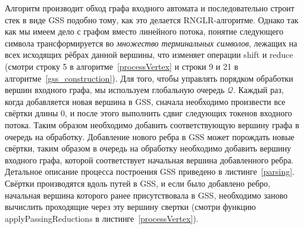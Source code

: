 Алгоритм производит обход графа входного автомата и последовательно строит стек в виде GSS подобно тому, как это делается RNGLR-алгоритме. Однако так как мы имеем дело с графом вместо линейного потока, понятие следующего символа трансформируется во \emph{множество терминальных символов}, лежащих на всех исходящих рёбрах данной вершины, что изменяет операции shift и reduce (смотри строку 5 в алгоритме~\ref{processVertex} и строки 9 и 21 в алгоритме~\ref{gss_construction}). Для того, чтобы управлять порядком обработки вершин входного графа, мы используем глобальную очередь $\mathcal{Q}$. Каждый раз, когда добавляется новая вершина в GSS, сначала необходимо произвести все свёртки длины 0, и после этого выполнить сдвиг следующих токенов входного потока. Таким образом необходимо добавить соответствующую вершину графа в очередь на обработку. Добавление нового ребра в GSS может порождать новые свёртки, таким образом в очередь на обработку необходимо добавить вершину входного графа, которой соответствует начальная вершина добавленного ребра. Детальное описание процесса построения GSS приведено в листинге~\ref{parsing}. Свёртки производятся вдоль путей в GSS, и если было добавлено ребро, начальная вершина которого ранее присутствовала в GSS, необходимо заново вычислить проходящие через эту вершину свертки (смотри функцию applyPassingReductions в листинге~\ref{processVertex}).

